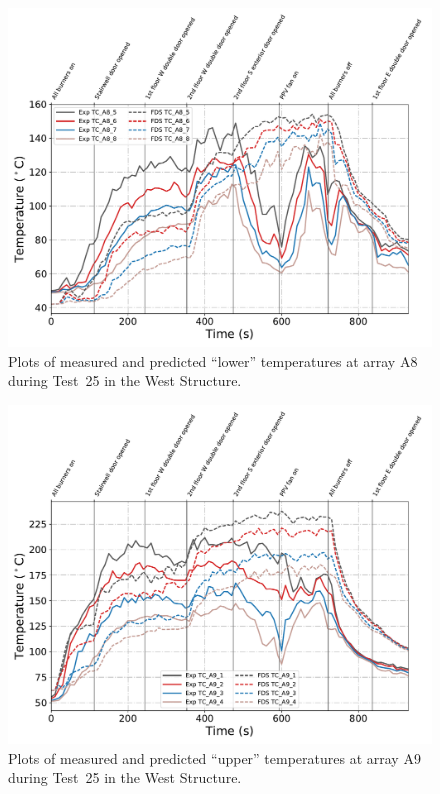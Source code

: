 \begin{figure}[!h]
	\centering
	\includegraphics[width=\columnwidth]{Figures/Plots/Validation/Temperature/Test_25_TC_A8_lower}
	\caption{Plots of measured and predicted ``lower'' temperatures at array A8 during Test~25 in the West Structure.}
	\label{fig:TCA8_lower_data_Test25}
\end{figure}

\begin{figure}[!h]
	\centering
	\includegraphics[width=\columnwidth]{Figures/Plots/Validation/Temperature/Test_25_TC_A9_upper}
	\caption{Plots of measured and predicted ``upper'' temperatures at array A9 during Test~25 in the West Structure.}
	\label{fig:TCA9_upper_data_Test25}
\end{figure}

